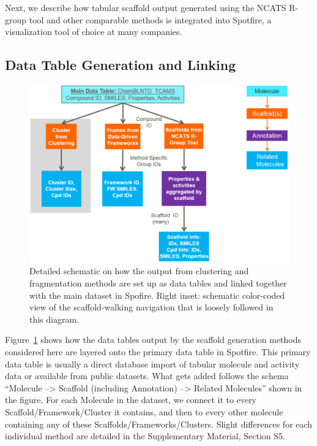 \documentclass[journal=jacsat,biochem,manuscript=article]{achemso}
\newcommand*\fref[1]{Figure~\ref{fig:#1}}
\begin{document}
Next, we describe how tabular scaffold output generated using the
NCATS R-group tool and other comparable methods is integrated into
Spotfire, a visualization tool of choice at many companies. 

\subsection{Data Table Generation and Linking}

\begin{figure}
\includegraphics[width=6in]{fig/details_all3_noSNG.png}
\caption{Detailed schematic on how the output from clustering and
  fragmentation methods are set up as data tables and linked together
  with the main dataset in Spofire. Right inset: schematic color-coded
  view of the scaffold-walking navigation that is loosely followed in
  this diagram.}
\label{fig:detaildevil}
\end{figure}

\fref{detaildevil} shows how the data tables output by the scaffold
generation methods considered here are layered onto the primary data
table in Spotfire. This primary data table is usually a direct database
import of tabular molecule and activity data or available from public
datasets. What gets added follows the schema ``Molecule --> Scaffold (including Annotation)
--> Related Molecules'' shown in the figure. For each Molecule in the
dataset, we connect it to every Scaffold/Framework/Cluster it
contains, and then to every other molecule containing any of these
Scaffolds/Frameworks/Clusters. Slight differences for each individual
method are detailed in the Supplementary Material, Section S5.
\end{document}
